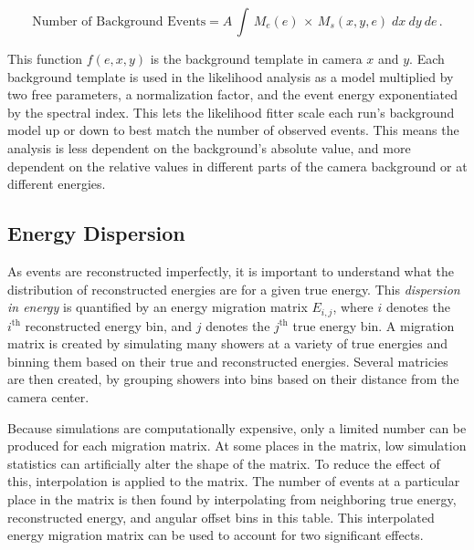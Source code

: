     \begin{equation}\label{eqn:background_template_function}
      \textrm{Number of Background Events} = A \, \int \, M_{e} \left ( e \right ) \, \times \, M_{s} \left ( x, y, e \right ) \; dx \: dy \: de \,.
    \end{equation}

    This function $f(e,x,y)$ is the background template in camera $x$ and $y$.
    Each background template is used in the likelihood analysis as a model multiplied by two free parameters, a normalization factor, and the event energy exponentiated by the spectral index.
    This lets the likelihood fitter scale each run's background model up or down to best match the number of observed events.
    This means the analysis is less dependent on the background's absolute value, and more dependent on the relative values in different parts of the camera background or at different energies.
  
  \FloatBarrier

  \subsection{Energy Dispersion}\label{subsec:edisp}
    As events are reconstructed imperfectly, it is important to understand what the distribution of reconstructed energies are for a given true energy.
    This \textit{dispersion in energy} is quantified by an energy migration matrix $E_{i,j}$, where $i$ denotes the $i^{\text{th}}$ reconstructed energy bin, and $j$ denotes the $j^{\text{th}}$ true energy bin.
    A migration matrix is created by simulating many showers at a variety of true energies and binning them based on their true and reconstructed energies.
    Several matricies are then created, by grouping showers into bins based on their distance from the camera center.
    
    Because simulations are computationally expensive, only a limited number can be produced for each migration matrix.
    At some places in the matrix, low simulation statistics can artificially alter the shape of the matrix.
    To reduce the effect of this, interpolation is applied to the matrix.
    The number of events at a particular place in the matrix is then found by interpolating from neighboring true energy, reconstructed energy, and angular offset bins in this table.
    This interpolated  energy migration matrix can be used to account for two significant effects.
    
